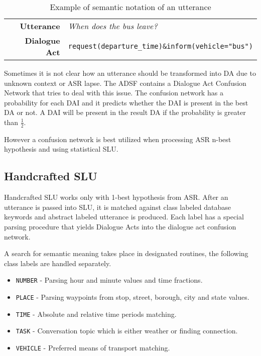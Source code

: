 \begin{table}[h]
\centering
\begin{tabular}{ r | l }
	\textbf{Utterance} & \textit{When does the bus leave?} \\
	\textbf{Dialogue Act} & \texttt{request(departure\_time)\&inform(vehicle="bus")}
\end{tabular}
\caption{Example of semantic notation of an utterance}
\label{table:utterance}
\end{table}

Sometimes it is not clear how an utterance should be transformed into DA due to unknown context or ASR lapse.
The ADSF contains a Dialogue Act Confusion Network that tries to deal with this issue.
The confusion network has a probability for each DAI and it predicts whether the DAI is present in the best DA or not. %
A DAI will be present in the result DA if the probability is greater than \( \frac{1}{2} \).

However a confusion network is best utilized when processing ASR n-best hypothesis and using statistical SLU.

\subsection{Handcrafted SLU}

Handcrafted SLU works only with 1-best hypothesis from ASR.
After an utterance is passed into SLU, it is matched against class labeled database keywords and abstract labeled utterance is produced.
Each label has a special parsing procedure that yields Dialogue Acts into the dialogue act confusion network.

A search for semantic meaning takes place in designated routines, the following class labels are handled separately.

\begin{itemize}
	\item \texttt{NUMBER} - Parsing hour and minute values and time fractions.
	\item \texttt{PLACE} - Parsing waypoints from stop, street, borough, city and state values.
	\item \texttt{TIME} - Absolute and relative time periods matching.
	\item \texttt{TASK} - Conversation topic  which is either weather or finding connection.
	\item \texttt{VEHICLE} - Preferred means of transport matching.
\end{itemize}

